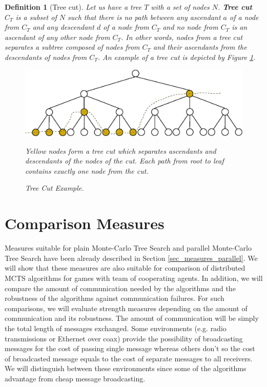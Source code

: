\newtheorem*{deftreecut}{Definition}
\begin{deftreecut}[Tree cut]

Let us have a tree $T$ with a set of nodes $N$. \textbf{Tree cut} $C_T$ is a subset of $N$ such that
there is no path between any ascendant $a$ of a node from $C_T$ and any descendant $d$ of a node from
$C_T$ and no node from $C_T$ is an ascendant of any other node from $C_T$. In other words, nodes from a 
tree cut separates a subtree composed of nodes from $C_T$ and
their ascendants from the descendants of nodes from $C_T$. An example of a tree cut is depicted by
Figure \ref{fig_tree_cut_example}.

\begin{figure}
\begin{center}
\includegraphics[width=14cm]{img/tree-cut.eps}
\end{center}
\caption{\footnotesize Tree Cut Example.}{\footnotesize Yellow nodes form a tree cut which
separates ascendants and descendants of the nodes of the cut. Each path from root to leaf
contains exactly one node from the cut.}
\label{fig_tree_cut_example}
\end{figure}

\end{deftreecut}





\section{Comparison Measures}
\label{sec_measures_distributed}

Measures suitable for plain Monte-Carlo Tree Search and parallel
Monte-Carlo Tree Search have been already described in Section \ref{sec_measures_parallel}.
We will show that these
measures are also suitable for comparison of distributed MCTS algorithms for games with team
of cooperating agents. In addition, we will compare the amount of communication needed by the
algorithms and the robustness of the algorithms against communication failures. For such
comparisons, we will evaluate strength measures depending on the amount of communication and
its robustness. The amount of communication will be simply the total length of messages
exchanged. Some environments (e.g. radio transmissions or Ethernet over coax) provide the 
possibility of broadcasting messages for the cost of passing single message whereas others 
don't so the cost of broadcasted message equals to the cost of separate messages to all
receivers. We will distinguish between these
environments since some of the algorithms advantage from cheap message broadcasting.

